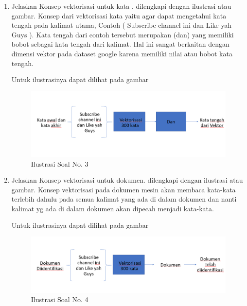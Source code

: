 \begin{enumerate}
\begin{figure}[ht]
\end{figure}

\item Jelaskan Konsep vektorisasi untuk kata . dilengkapi dengan ilustrasi atau gambar.
\subitem Konsep dari vektorisasi kata yaitu agar dapat mengetahui kata tengah pada kalimat utama, Contoh ( Subscribe channel ini dan Like yah Guys ). Kata tengah dari contoh tersebut merupakan (dan) yang memiliki bobot sebagai kata tengah dari kalimat. Hal ini sangat berkaitan dengan dimensi vektor pada dataset google karena memiliki nilai atau bobot kata tengah.
\par Untuk ilustrasinya dapat dilihat pada gambar \begin{figure}[ht]
	\centerline{\includegraphics[width=1\textwidth]{figures/andi/L3.PNG}}
	\caption{Ilustrasi Soal No. 3}
	
\end{figure}
\item Jelaskan Konsep vektorisasi untuk dokumen. dilengkapi dengan ilustrasi atau gambar.
\subitem Konsep vektorisasi pada dokumen mesin akan membaca kata-kata terlebih dahulu pada semua kalimat yang ada di dalam dokumen dan nanti kalimat yg ada di dalam dokumen akan dipecah menjadi kata-kata.
\par Untuk ilustrasinya dapat dilihat pada gambar 
\begin{figure}[ht]
	\centerline{\includegraphics[width=1\textwidth]{figures/andi/L4.PNG}}
	\caption{Ilustrasi Soal No. 4}
	
\end{figure}


\end{enumerate}
